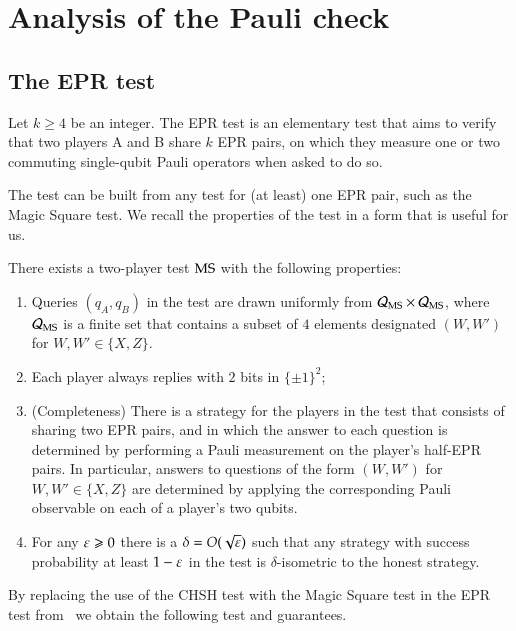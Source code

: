 \section{Analysis of the Pauli check}


\subsection{The EPR test}

Let $k\geq 4$ be an integer. 
The EPR test is an elementary test that aims to verify that two players A and B share $k$ EPR pairs, on which they measure one or two commuting single-qubit Pauli operators when asked to do so. 

The test can be built from any test for (at least) one EPR pair, such as the Magic Square test. We recall the properties of the test in a form that is useful for us. 

\begin{theorem}\label{thm:ms-rigid}
There exists a two-player test $\textsc{MS}$ with the following properties:
\begin{enumerate}
\item Queries $(q_A,q_B)$ in the test are drawn uniformly from $\mathcal{Q}_{\textsc{MS}} \times \mathcal{Q}_{\textsc{MS}}$, where $\mathcal{Q}_{\textsc{MS}}$ is a finite set that contains a subset of $4$ elements designated $(W,W')$ for $W,W'\in\{X,Z\}$. 
\item Each player always replies with $2$ bits in $\{\pm 1\}^2$;
\item (Completeness) There is a strategy for the players in the test that consists of sharing two EPR pairs, and in which the answer to each question is determined by performing a Pauli measurement on the player's half-EPR pairs. In particular, answers to questions of the form $(W,W')$ for $W,W'\in\{X,Z\}$ are determined by applying the corresponding Pauli observable on each of a player's two qubits. 
\item For any $\varepsilon\geqslant 0$ there is a $\delta = O(\sqrt{\varepsilon})$ such that
   any strategy with success probability at least $1-\varepsilon$ in the test is $\delta$-isometric to the honest strategy. 
\end{enumerate}
\end{theorem}

By replacing the use of the CHSH test with the Magic Square test in the EPR test from~\cite{chao2016test} we obtain the following test and guarantees. 

